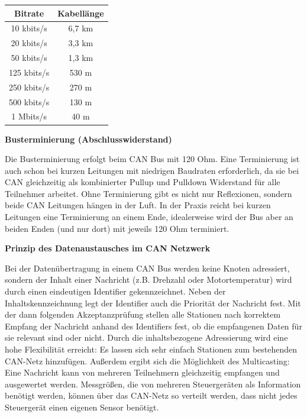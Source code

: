\begin{table}[H]
	\begin{tabular}{|c|c|}
		\hline
		\textbf{Bitrate} & \textbf{Kabellänge} \\ \hline
		10 kbits/s       & 6,7 km              \\ \hline
		20 kbits/s       & 3,3 km              \\ \hline
		50 kbits/s       & 1,3 km              \\ \hline
		125 kbits/s      & 530 m               \\ \hline
		250 kbits/s      & 270 m               \\ \hline
		500 kbits/s      & 130 m               \\ \hline
		1 Mbits/s        & 40 m                \\ \hline
	\end{tabular}
\end{table}

\textbf{Busterminierung (Abschlusswiderstand)}

Die Busterminierung erfolgt beim CAN Bus mit 120 Ohm. Eine Terminierung ist auch
schon bei kurzen Leitungen mit niedrigen Baudraten erforderlich, da sie bei CAN
gleichzeitig als kombinierter Pullup und Pulldown Widerstand für alle Teilnehmer arbeitet.
Ohne Terminierung gibt es nicht nur Reflexionen, sondern beide CAN Leitungen hängen
in der Luft. In der Praxis reicht bei kurzen Leitungen eine Terminierung an einem Ende,
idealerweise wird der Bus aber an beiden Enden (und nur dort) mit jeweils 120 Ohm
terminiert.

\textbf{Prinzip des Datenaustausches im CAN Netzwerk}

Bei der Datenübertragung in einem CAN Bus werden keine Knoten adressiert, sondern
der Inhalt einer Nachricht (z.B. Drehzahl oder Motortemperatur) wird durch einen
eindeutigen Identifier gekennzeichnet. Neben der Inhaltskennzeichnung legt der Identifier
auch die Priorität der Nachricht fest.
Mit der dann folgenden Akzeptanzprüfung stellen alle Stationen nach korrektem Empfang
der Nachricht anhand des Identifiers fest, ob die empfangenen Daten für sie relevant sind
oder nicht. Durch die inhaltsbezogene Adressierung wird eine hohe Flexibilität erreicht: Es
lassen sich sehr einfach Stationen zum bestehenden CAN-Netz hinzufügen.
Außerdem ergibt sich die Möglichkeit des Multicasting: Eine Nachricht kann von mehreren
Teilnehmern gleichzeitig empfangen und ausgewertet werden. Messgrößen, die von
mehreren Steuergeräten als Information benötigt werden, können über das CAN-Netz so
verteilt werden, dass nicht jedes Steuergerät einen eigenen Sensor benötigt.

